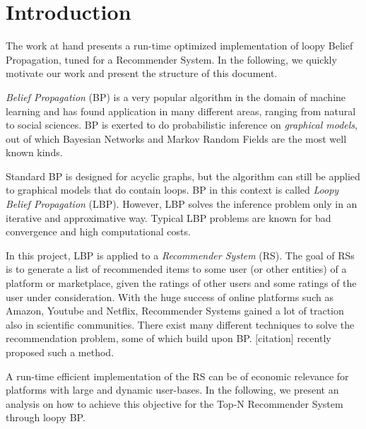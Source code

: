 
\section{Introduction}\label{sec:intro}
The work at hand presents a run-time optimized implementation of loopy Belief Propagation, tuned for a Recommender System. In the following, we quickly motivate our work and present the structure of this document.



\textit{Belief Propagation} (BP) is a very popular algorithm in the domain of machine learning and has found application in many different areas, ranging from natural to social sciences. BP is exerted to do probabilistic inference on \textit{graphical models}, out of which Bayesian Networks and Markov Random Fields are the most well known kinds.

Standard BP is designed for acyclic graphs, but the algorithm can still be applied to graphical models that do contain loops. BP in this context is called \textit{Loopy Belief Propagation} (LBP). However, LBP solves the inference problem only in an iterative and approximative way. Typical LBP problems are known for bad convergence and high computational costs.

In this project, LBP is applied to a \textit{Recommender System} (RS). The goal of RSs is to generate a list of recommended items to some user (or other entities) of a platform or marketplace, given the ratings of other users and some ratings of the user under consideration. With the huge success of online platforms such as Amazon, Youtube and Netflix, Recommender Systems gained a lot of traction also in scientific communities. There exist many different techniques to solve the recommendation problem, some of which build upon BP. [citation] recently proposed such a method. 

A run-time efficient implementation of the RS can be of economic relevance for platforms with large and dynamic user-bases. In the following, we present an analysis on how to achieve this objective for the Top-N Recommender System through loopy BP.


